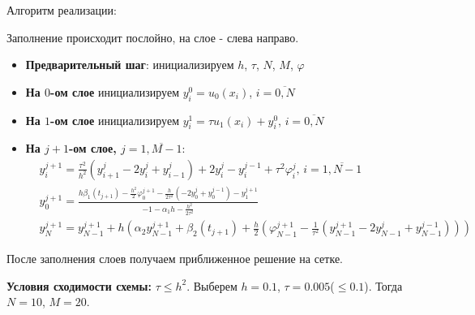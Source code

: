 Алгоритм реализации:\par
Заполнение происходит послойно, на слое - слева направо.
\begin{itemize}
\item \textbf{Предварительный шаг}: инициализируем $h$, $\tau$, $N$, $M$, $\varphi$
\item \textbf{На $0$-ом слое} инициализируем $y_{i}^{0} = u_{0}(x_{i})$, $i=\overline{0,N}$
\item \textbf{На $1$-ом слое} инициализируем $y_{i}^{1} = \tau u_{1}(x_{i})+y_{i}^{0}$, $i=\overline{0,N}$
\item { \textbf{На $j+1$-ом слое, $j=\overline{1,M-1}$}:
\begin{eqnarray*}
& y_{i}^{j+1} = \frac{\tau^{2}}{h^{2}}(y_{i+1}^{j}-2y_{i}^{j}+y_{i-1}^{j}) + 2y_{i}^{j} - y_{i}^{j-1} + \tau^{2}\varphi_{i}^{j}\text{, }i=\overline{1,N-1} \\
& y_{0}^{j+1} = \frac{h \beta_{1}(t_{j+1}) -\frac{h^{2}}{2}\varphi_{0}^{j+1} -\frac{h}{2\tau^{2}}(-2y_{0}^{j}+ y_{0}^{j-1})-y_{1}^{j+1}}{-1-\alpha_{1}h-\frac{h^{2}}{2\tau^{2}}} \\
& y_{N}^{j+1} = y_{N-1}^{j+1} + h(\alpha_{2}y_{N-1}^{j+1}+\beta_{2}(t_{j+1})+ \frac{h}{2}(\varphi_{N-1}^{j+1}-\frac{1}{\tau^2}(y_{N-1}^{j+1}-2y_{N-1}^{j}+y_{N-1}^{j-1})))
\end{eqnarray*}
}
\end{itemize} \par
После заполнения слоев получаем приближенное решение на сетке. \par
\textbf{Условия сходимости схемы:} $\tau \le h^{2}$. Выберем $h=0.1$, $\tau=0.005$($\le 0.1$). Тогда $N=10$, $M=20$. \par

